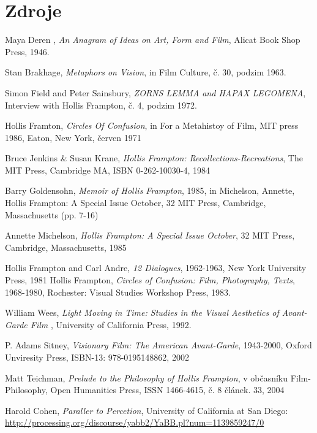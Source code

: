 \documentclass[11pt]{article}
\begin{document}
\printindex

\newpage
\section{Zdroje}

\begin{thebibliography}{9}


 Maya Deren , \emph{An Anagram of Ideas on Art, Form and Film}, Alicat Book Shop Press, 1946.

 Stan Brakhage, \emph{Metaphors on Vision}, in Film Culture, č. 30, podzim 1963.

 Simon Field and Peter Sainsbury, \emph{ZORNS LEMMA and HAPAX LEGOMENA}, Interview with Hollis Frampton, č. 4, podzim 1972.

 Hollis Framton, \emph{Circles Of Confusion}, in For a Metahistoy of Film, MIT press 1986, Eaton, New York, červen 1971

 Bruce Jenkins \& Susan Krane, \emph{Hollis Frampton: Recollections-Recreations}, The MIT Press, Cambridge MA, ISBN 0-262-10030-4,  1984

Barry Goldensohn, \emph{Memoir of Hollis Frampton}, 1985, in Michelson, Annette, Hollis Frampton: A Special Issue October, 32 MIT Press, Cambridge, Massachusetts (pp. 7-16)

Annette Michelson, \emph{Hollis Frampton: A Special Issue October}, 32 MIT Press, Cambridge, Massachusetts,  1985

Hollis Frampton and Carl Andre, \emph{12 Dialogues}, 1962-1963, New York University Press, 1981
Hollis Frampton, \emph{Circles of Confusion: Film, Photography, Texts}, 1968-1980, Rochester: Visual Studies Workshop Press, 1983.

William Wees, \emph{Light Moving in Time: Studies in the Visual Aesthetics of Avant-Garde Film }, University of California Press, 1992.

P. Adams Sitney, \emph{Visionary Film: The American Avant-Garde}, 1943-2000, Oxford Unviresity Press, ISBN-13: 978-0195148862, 2002

Matt Teichman, \emph{Prelude to the Philosophy of Hollis Frampton}, v občasníku Film-Philosophy, Open Humanities Press, ISSN 1466-4615, č. 8 článek. 33, 2004

 Harold Cohen, \emph{Paraller to Percetion}, University of California at San Diego:   \url{http://processing.org/discourse/yabb2/YaBB.pl?num=1139859247/0}

\end{thebibliography}
\end{document}
